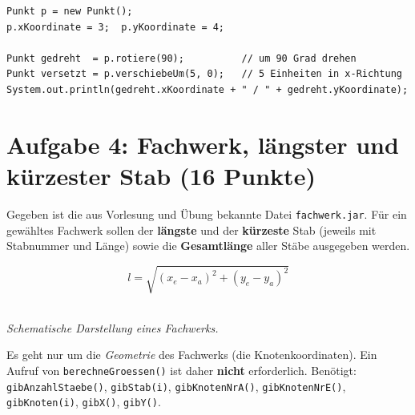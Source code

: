 \documentclass[
	fontsize=12pt,
	paper=a4,
	numbers=noenddot,
	parskip=half,
	openany
]{scrbook}
\begin{document}
\begin{lstlisting}
Punkt p = new Punkt();
p.xKoordinate = 3;  p.yKoordinate = 4;

Punkt gedreht  = p.rotiere(90);          // um 90 Grad drehen
Punkt versetzt = p.verschiebeUm(5, 0);   // 5 Einheiten in x-Richtung
System.out.println(gedreht.xKoordinate + " / " + gedreht.yKoordinate);
\end{lstlisting}

\clearpage
\section*{Aufgabe 4: Fachwerk, längster und kürzester Stab \hfill (16 Punkte)}

Gegeben ist die aus Vorlesung und Übung bekannte Datei \texttt{fachwerk.jar}.
Für ein gewähltes Fachwerk sollen der \textbf{längste} und der \textbf{kürzeste} Stab (jeweils mit Stabnummer und Länge) sowie die \textbf{Gesamtlänge} aller Stäbe ausgegeben werden.

\begin{formeln}
\[ l = \sqrt{(x_e - x_a)^2 + (y_e - y_a)^2} \]
\end{formeln}

\begin{center}
\\[-0.3em]
{\footnotesize\itshape Schematische Darstellung eines Fachwerks.}
\end{center}

\begin{hinweis}[Wichtig]
	Es geht nur um die \emph{Geometrie} des Fachwerks (die Knotenkoordinaten).
	Ein Aufruf von \texttt{berechneGroessen()} ist daher \textbf{nicht} erforderlich.
	Benötigt: \texttt{gibAnzahlStaebe()}, \texttt{gibStab(i)}, \texttt{gibKnotenNrA()}, \texttt{gibKnotenNrE()}, \texttt{gibKnoten(i)}, \texttt{gibX()}, \texttt{gibY()}.
\end{hinweis}
\end{document}
